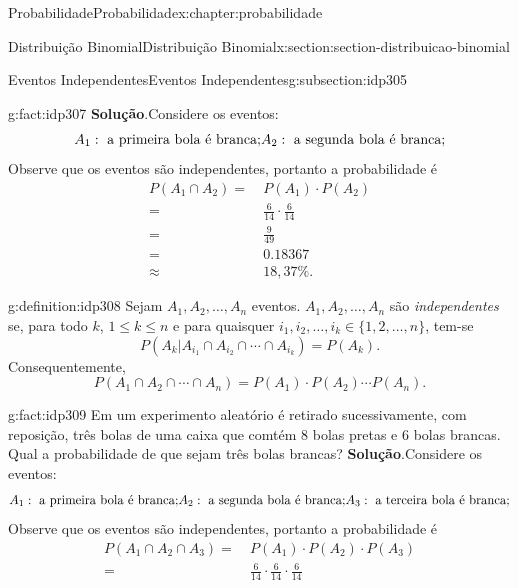 \documentclass[oneside,10pt,]{book}
\newcommand{\blocktitlefont}{\relax}
\numberwithin{equation}{section}
\newcommand{\amp}{&}
\begin{document}
\begin{chapterptx}{Probabilidade}{}{Probabilidade}{}{}{x:chapter:probabilidade}
\begin{sectionptx}{Distribuição Binomial}{}{Distribuição Binomial}{}{}{x:section:section-distribuicao-binomial}
\begin{subsectionptx}{Eventos Independentes}{}{Eventos Independentes}{}{}{g:subsection:idp305}
\begin{fact}{}{}{g:fact:idp307}
\textbf{\blocktitlefont Solução}.\quad{}Considere os eventos:%
\begin{equation*}
A_1: \text{ a primeira bola é branca;}\\
A_2: \text{ a segunda bola é branca;}\\
\end{equation*}
Observe que os eventos são independentes, portanto a probabilidade é%
\begin{align*}
P(A_1\cap A_2) = \amp ~ P(A_1)\cdot P(A_2)\\
= \amp ~ \frac{6}{14}\cdot \frac{6}{14} \\
= \amp ~\frac{9}{49} \\
= \amp ~ 0.18367 \\
\approx \amp ~ 18,37\%. 
\end{align*}
%
\end{fact}
\begin{definition}{}{g:definition:idp308}%
Sejam \(A_1, A_2, \ldots, A_n\) eventos.  \(A_1, A_2, \ldots, A_n\) são \emph{independentes} se, para todo \(k\), \(1 \leq k \leq n\) e para quaisquer \(i_1, i_2, \ldots, i_k\in \{1, 2, \ldots, n\}\), tem-se%
\begin{equation*}
P(A_k|A_{i_1}\cap A_{i_2}\cap \cdots \cap A_{i_k}) = P(A_k). 
\end{equation*}
Consequentemente,%
%
\begin{equation*}
P(A_{1}\cap A_{2}\cap \cdots \cap A_{n}) = P(A_{1})\cdot P(A_{2})\cdots P(A_{n}). 
\end{equation*}
%
\end{definition}
\begin{fact}{}{}{g:fact:idp309}%
Em um experimento aleatório é retirado sucessivamente, com reposição, três bolas de uma caixa que comtém 8 bolas pretas e 6 bolas brancas. Qual a probabilidade de que sejam três bolas brancas?%
\textbf{\blocktitlefont Solução}.\quad{}Considere os eventos:%
\begin{equation*}
A_1: \text{ a primeira bola é branca;}\\
A_2: \text{ a segunda bola é branca;}\\
A_3: \text{ a terceira bola é branca;}\\
\end{equation*}
Observe que os eventos são independentes, portanto a probabilidade é%
\begin{align*}
P(A_1\cap A_2\cap A_3) = \amp ~ P(A_1)\cdot P(A_2)\cdot P(A_3) \\
= \amp ~ \frac{6}{14}\cdot \frac{6}{14}\cdot \frac{6}{14} \\

\end{align*}
\end{fact}
\end{subsectionptx}
\end{sectionptx}
\end{chapterptx}
\end{document}
